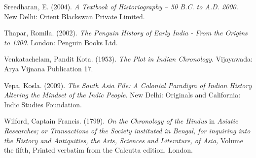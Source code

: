 \begin{thebibliography}{99}
  Sreedharan, E. (2004). \textit{A Textbook of Historiography – 50 B.C. to A.D. 2000.} New Delhi: Orient Blackswan Private Limited.

  Thapar, Romila. (2002). \textit{The Penguin History of Early India - From the Origins to 1300}. London: Penguin Books Ltd.

  Venkatachelam, Pandit Kota. (1953). \textit{The Plot in Indian Chronology}. Vijayawada: Arya Vijnana Publication 17.

  Vepa, Kosla. (2009). \textit{The South Asia File: A Colonial Paradigm of Indian History Altering the Mindset of the Indic People}. New Delhi: Originals and California: Indic Studies Foundation.

  Wilford, Captain Francis. (1799). \textit{On the Chronology of the Hindus} in \textit{Asiatic Researches; or Transactions of the Society instituted in Bengal, for inquiring into the History and Antiquities, the Arts, Sciences and Literature, of Asia,} Volume the fifth, Printed verbatim from the Calcutta edition. London.
 
 \end{thebibliography}

\theendnotes

